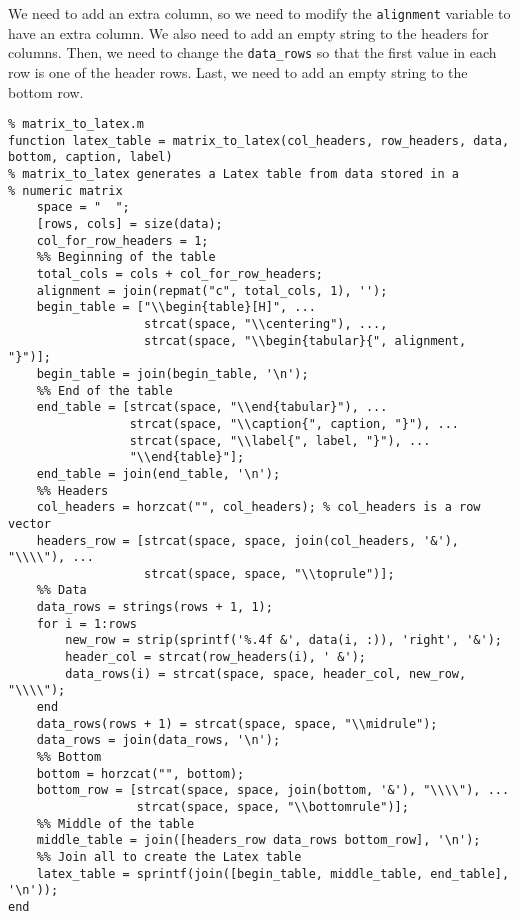 \documentclass[12pt, a4paper]{article}
\begin{document}
We need to add an extra column, so we need to modify the \texttt{alignment} variable to have an extra column.
We also need to add an empty string to the headers for columns.
Then, we need to change the \texttt{data\_rows} so that the first value in each row is one of the header rows.
Last, we need to add an empty string to the bottom row.
\lstset{language=matlab,label= ,caption= ,captionpos=b,firstnumber=1,numbers=left,style=Matlab-editor}
\begin{lstlisting}
% matrix_to_latex.m
function latex_table = matrix_to_latex(col_headers, row_headers, data, bottom, caption, label)
% matrix_to_latex generates a Latex table from data stored in a
% numeric matrix
    space = "  ";
    [rows, cols] = size(data);
    col_for_row_headers = 1;
    %% Beginning of the table
    total_cols = cols + col_for_row_headers;
    alignment = join(repmat("c", total_cols, 1), '');
    begin_table = ["\\begin{table}[H]", ...
                   strcat(space, "\\centering"), ...,
                   strcat(space, "\\begin{tabular}{", alignment, "}")];
    begin_table = join(begin_table, '\n');
    %% End of the table
    end_table = [strcat(space, "\\end{tabular}"), ...
                 strcat(space, "\\caption{", caption, "}"), ...
                 strcat(space, "\\label{", label, "}"), ...
                 "\\end{table}"];
    end_table = join(end_table, '\n');
    %% Headers
    col_headers = horzcat("", col_headers); % col_headers is a row vector
    headers_row = [strcat(space, space, join(col_headers, '&'), "\\\\"), ...
                   strcat(space, space, "\\toprule")];
    %% Data
    data_rows = strings(rows + 1, 1);
    for i = 1:rows
        new_row = strip(sprintf('%.4f &', data(i, :)), 'right', '&');
        header_col = strcat(row_headers(i), ' &');
        data_rows(i) = strcat(space, space, header_col, new_row, "\\\\");
    end
    data_rows(rows + 1) = strcat(space, space, "\\midrule");
    data_rows = join(data_rows, '\n');
    %% Bottom
    bottom = horzcat("", bottom);
    bottom_row = [strcat(space, space, join(bottom, '&'), "\\\\"), ...
                  strcat(space, space, "\\bottomrule")];
    %% Middle of the table
    middle_table = join([headers_row data_rows bottom_row], '\n');
    %% Join all to create the Latex table
    latex_table = sprintf(join([begin_table, middle_table, end_table], '\n'));
end
\end{lstlisting}
\end{document}
